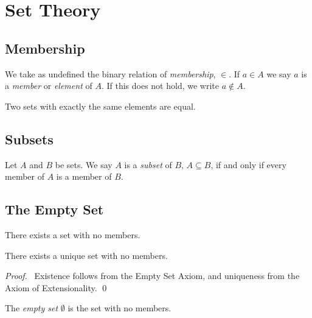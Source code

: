 \chapter{Set Theory}

\section{Membership}

We take as undefined the binary relation of \emph{membership}, $\in$. If $a \in A$ we say $a$ is a \emph{member} or \emph{element} of $A$.
If this does not hold, we write $a \notin A$.

\begin{axiom}
    Two sets with exactly the same elements are equal.
\end{axiom}

\section{Subsets}

\begin{definition}[Subset]
    Let $A$ and $B$ be sets. We say $A$ is a \emph{subset} of $B$, $A \subseteq B$, if and only if every member of $A$ is a member of $B$.    
\end{definition}

\section{The Empty Set}

\begin{axiom}
    There exists a set with no members.
\end{axiom}

\begin{proposition}
    There exists a unique set with no members.
\end{proposition}

\begin{proof}
    \pf\ Existence follows from the Empty Set Axiom, and uniqueness from the Axiom of Extensionality. \qed
\end{proof}

\begin{definition}
    The \emph{empty set} $\emptyset$ is the set with no members.
\end{definition}

